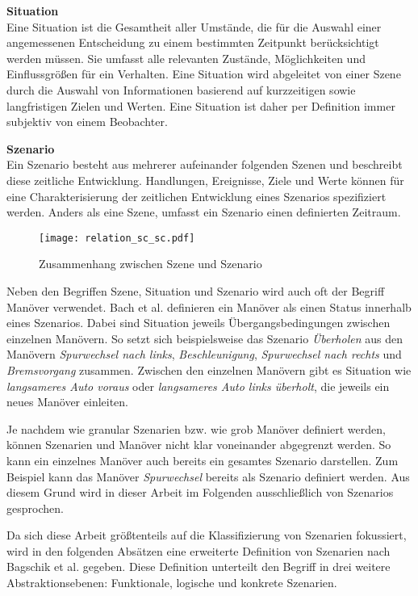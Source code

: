 \noindent\textbf{Situation}\\
Eine Situation ist die Gesamtheit aller Umstände, die für die Auswahl einer angemessenen Entscheidung zu einem bestimmten Zeitpunkt berücksichtigt werden müssen. Sie umfasst alle relevanten Zustände, Möglichkeiten und Einflussgrößen für ein Verhalten. Eine Situation wird abgeleitet von einer Szene durch die Auswahl von Informationen basierend auf kurzzeitigen sowie langfristigen Zielen und Werten. Eine Situation ist daher per Definition immer subjektiv von einem Beobachter.

\noindent\textbf{Szenario}\\
Ein Szenario besteht aus mehrerer aufeinander folgenden Szenen und beschreibt diese zeitliche Entwicklung. Handlungen, Ereignisse, Ziele und Werte können für eine Charakterisierung der zeitlichen Entwicklung eines Szenarios spezifiziert werden. Anders als eine Szene, umfasst ein Szenario einen definierten Zeitraum.

\begin{figure}[h]
\centering
\texttt{[image: relation\_sc\_sc.pdf]}
\caption{Zusammenhang zwischen Szene und Szenario \cite{ulbrich2015defining}}
\label{fig_relation_sc_sc}
\end{figure}

Neben den Begriffen Szene, Situation und Szenario wird auch oft der Begriff Manöver verwendet. Bach et al. \cite{bach2016model} definieren ein Manöver als einen Status innerhalb eines Szenarios. Dabei sind Situation jeweils Übergangsbedingungen zwischen einzelnen Manövern. So setzt sich beispielsweise das Szenario \textit{Überholen} aus den Manövern \textit{Spurwechsel nach links}, \textit{Beschleunigung}, \textit{Spurwechsel nach rechts} und \textit{Bremsvorgang} zusammen. Zwischen den einzelnen Manövern gibt es Situation wie \textit{langsameres Auto voraus} oder \textit{langsameres Auto links überholt}, die jeweils ein neues Manöver einleiten.

Je nachdem wie granular Szenarien bzw. wie grob Manöver definiert werden, können Szenarien und Manöver nicht klar voneinander abgegrenzt werden. So kann ein einzelnes Manöver auch bereits ein gesamtes Szenario darstellen. Zum Beispiel kann das Manöver \textit{Spurwechsel} bereits als Szenario definiert werden. Aus diesem Grund wird in dieser Arbeit im Folgenden ausschließlich von Szenarios gesprochen.

Da sich diese Arbeit größtenteils auf die Klassifizierung von Szenarien fokussiert, wird in den folgenden Absätzen eine erweiterte Definition von Szenarien nach Bagschik et al. \cite{bagschik2017szenarien} gegeben. Diese Definition unterteilt den Begriff in drei weitere Abstraktionsebenen: Funktionale, logische und konkrete Szenarien.

